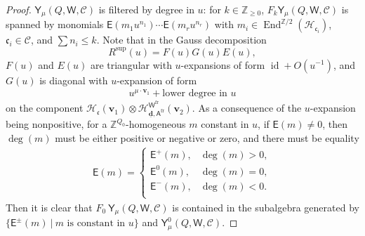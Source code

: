 \documentclass[10pt]{amsart}
\theoremstyle{definition}
\numberwithin{equation}{section}
\newcommand{\bZ}{\mathbb{Z}}
\newcommand{\bv}{\mathbf{v}}
\newcommand{\bd}{\mathbf{d}}
\newcommand{\cH}{\mathcal{H}}
\newcommand{\sA}{\mathsf{A}}
\newcommand{\sW}{\mathsf{W}}
\newcommand{\End}{\operatorname{End}}
\newcommand{\id}{\operatorname{id}}
\begin{document}
\begin{proof}
$\mathsf Y_\mu(Q,\sW,\mathcal C)$ is filtered by degree in $u$: for $k\in \bZ_{\geqslant 0}$, $F_k\mathsf Y_\mu(Q,\sW,\mathcal C)$ is spanned by monomials $\mathsf E(m_1u^{n_1})\cdots \mathsf E(m_ru^{n_r})$ with $m_i\in \End^{\bZ/2}(\cH_{\mathfrak{c}_i})$, $\mathfrak{c}_i\in \mathcal C$, and $\sum n_i\leqslant k$. Note that in the Gauss decomposition 
$$R^{\mathrm{sup}}(u)=F(u)G(u)E(u),$$ $F(u)$ and $E(u)$ are triangular with $u$-expansions of form $\id+O(u^{-1})$, and $G(u)$ is diagonal with $u$-expansion of form 
\begin{align*}
    u^{\mu\cdot\bv_1}+\text{lower degree in }u
\end{align*}
on the component $\cH_{\mathfrak{c}}(\bv_1)\otimes\cH^{\sW^\mathrm{fr}}_{\underline{\bd},\sA^{\mathrm{fr}}}(\bv_2)$. As a consequence of the $u$-expansion being nonpositive, for a $\bZ^{Q_0}$-homogeneous $m$ constant in $u$, if $\mathsf E(m)\neq 0$, then $\deg(m)$ must be either positive or negative or zero, and there must be equality
\begin{align*}
    \mathsf E(m)=\begin{cases}
        \mathsf E^+(m) , & \deg(m)>0,\\
        \mathsf E^0(m) , & \deg(m)=0,\\
        \mathsf E^-(m) , & \deg(m)<0.\\
    \end{cases}
\end{align*}
Then it is clear that $F_0\:\mathsf Y_\mu(Q,\sW,\mathcal C)$ is contained in the subalgebra generated by $\{\mathsf E^{\pm}(m)\:|\: m\text{ is constant in }u\}$ and $\mathsf Y^0_\mu(Q,\sW,\mathcal C)$.


\end{proof}
\end{document}
